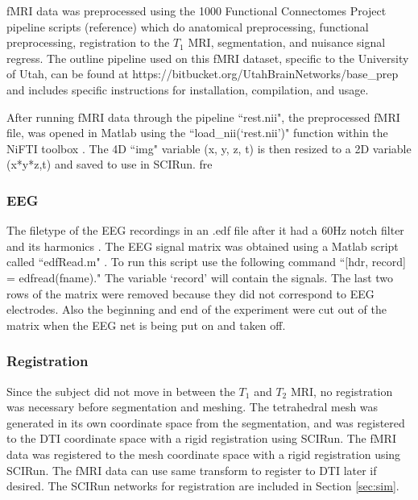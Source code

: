 fMRI data was preprocessed using the 1000 Functional Connectomes Project pipeline scripts (reference) which do anatomical preprocessing, functional preprocessing, registration to the $T_1$ MRI, segmentation, and nuisance signal regress. The outline pipeline used on this fMRI dataset, specific to the University of Utah, can be found at https://bitbucket.org/UtahBrainNetworks/base\_prep and includes specific instructions for installation, compilation, and usage.  

After running fMRI data through the pipeline ``rest.nii", the preprocessed fMRI file, was opened in Matlab using the ``load\_nii(`rest.nii')" function within the NiFTI toolbox \cite{ref:nifti}. The 4D ``img" variable (x, y, z, t) is then resized to a 2D variable (x*y*z,t) and saved to use in SCIRun. 
fre
\subsubsection{EEG}

The filetype of the EEG recordings in an .edf file after it had a 60Hz notch filter and its harmonics \cite{ref:filter}. The EEG signal matrix was obtained using a Matlab script called ``edfRead.m" \cite{ref:edfread}. To run this script use the following command ``[hdr, record] = edfread(fname)." The variable `record' will contain the signals. The last two rows of the matrix were removed because they did not correspond to EEG electrodes. Also the beginning and end of the experiment were cut out of the matrix when the EEG net is being put on and taken off. 

\subsubsection{Registration}

Since the subject did not move in between the $T_1$ and $T_2$ MRI, no registration was necessary before segmentation and meshing. The tetrahedral mesh was generated in its own coordinate space from the segmentation, and was registered to the DTI coordinate space with a rigid registration using SCIRun. The fMRI data was registered to the mesh coordinate space with a rigid registration using SCIRun. The fMRI data can use same transform to register to DTI later if desired. The SCIRun networks for registration are included in Section \ref{sec:sim}.

